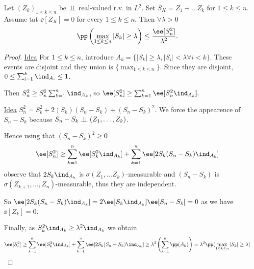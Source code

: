 \documentclass[../main.tex]{subfiles}
\begin{document}
  \begin{lemma}

    Let $(Z_k)_{1 \leq k \leq n}$ be $\perp\!\!\!\!\,\perp$ real-valued r.v. in $L^2$. Set
    $S_K = Z_1 + \ldots Z_k$ for $1 \leq k \leq n$. Assume tat $\ee[Z_K] = 0$
    for every $1 \leq k \leq n$. Then $\forall \lambda > 0$
    \[
      \pp \left( \max\limits_{1 \leq k \leq n}|S_k| \geq \lambda \right)  \leq
      \frac{\ee[S_n^2]}{\lambda^2} 
    .\] 
  \end{lemma}
  \begin{proof}
    \underline{Idea} For $1 \leq k \leq n$, introduce $A_k = \{ |S_k| \geq
    \lambda, |S_i| < \lambda \forall i < k \} $. These events are disjoint and
    they union is $\{ \max_{1 \leq k \leq n} \} $. Since they are disjoint, $0
    \leq \sum_{i=1}^k \ind_{A_i} \leq 1$. 

    Then $S_n^2 \geq S_n^2 \sum_{k=1}^n \ind_{A_k}$, so $\ee[S_n^2] \geq \sum_{k=1}^n \ee[S_n^2 \ind_{A_k}]
    .$ 
    \vspace{0.8em}

    \underline{Idea} $S_n^2 = S_k^2 + 2(S_k)(S_n - S_k) + (S_n - S_k)^2$. We
    force the appearence of $S_n - S_k$ because $S_n - S_k \perp\!\!\!\!\,\perp (Z_1, \ldots,
    Z_k)$.

    \vspace{0.3em}

    Hence using that $(S_n - S_k)^2 \geq 0$
    \[
      \ee[S_n^2] \geq \sum_{k=1}^n \ee[S_k^2 \ind_{A_k}] + \sum_{k=1}^n
      \ee[2S_k(S_n - S_k)\ind_{A_k}]
    \] 
    observe that $2 S_k \ind_{A_k}$ is $\sigma(Z_1, \ldots Z_k)$-measurable
    and $(S_n - S_k)$ is $\sigma(Z_{k+1}, \ldots, Z_n)$-measurable, thus they
    are independent.

    \vspace{0.6em}

    So $\ee[2 S_k(S_n - S_k) \ind_{A_k}] = 2 \ee[S_k \ind_{A_k}]\ee[S_n - S_k] =
    0$ as we have $\ee[Z_k] = 0$.
    
    \vspace{0.6em}

    Finally, as $S_k^2 \ind_{A_k} \geq \lambda^2 \ind_{A_k}$ we obtain
    \[
      \ee[S_n^2] \geq \sum_{k=1}^n \ee[S_k^2 \ind_{A_k}] + \sum_{k=1}^n
      \ee[2S_k(S_n - S_k)\ind_{A_k}] \geq \lambda^2 \left( \sum_{k =1}^n
      \pp(A_k) \right) = \lambda^2 \pp(\max_{1 \leq k \leq n} |S_k| \geq
      \lambda)
    \] 
  \end{proof}
\end{document}
